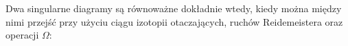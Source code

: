 \begin{proposition}
    Dwa singularne diagramy są równoważne dokładnie wtedy, kiedy można między nimi przejść przy użyciu ciągu izotopii otaczających, ruchów Reidemeistera oraz operacji $\Omega$:

\end{proposition}

